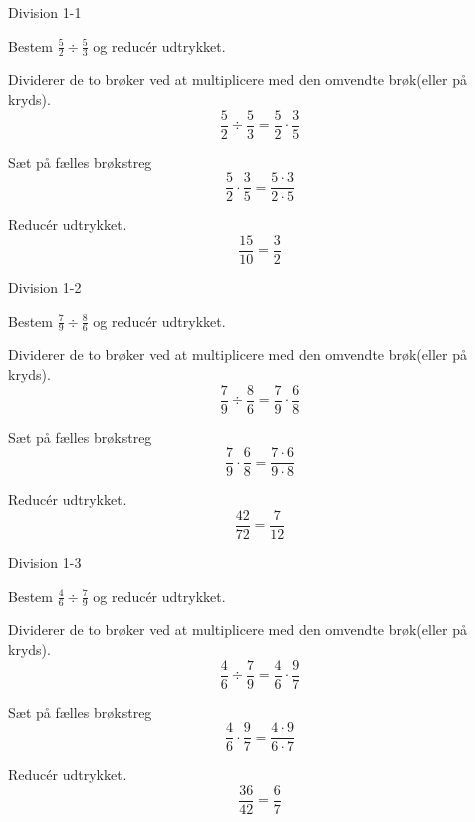\documentclass{article}
\begin{document}
\tableofcontents
\newpage

\begin{exercise}{Division 1-1}

Bestem $\frac{5}{2} \div \frac{5}{3}$ og reducér udtrykket.


\hint

Dividerer de to brøker ved at multiplicere med den omvendte brøk(eller på kryds).
\[
\frac{5}{2} \div \frac{5}{3} = \frac{5}{2} \cdot \frac{3}{5}
\]

\hint

Sæt på fælles brøkstreg
\[
 \frac{5}{2} \cdot \frac{3}{5} = \frac{5 \cdot 3}{2 \cdot 5}
\]

\hint

Reducér udtrykket.
\[
\frac{15}{10} = \frac{3}{2} 
\]

\end{exercise}

\newpage

\begin{exercise}{Division 1-2}
	
	Bestem $\frac{7}{9} \div \frac{8}{6}$ og reducér udtrykket.
	
	
	\hint
	
	Dividerer de to brøker ved at multiplicere med den omvendte brøk(eller på kryds).
	\[
	\frac{7}{9} \div \frac{8}{6} = \frac{7}{9} \cdot \frac{6}{8}
	\]
	
	\hint
	
	Sæt på fælles brøkstreg
	\[
	\frac{7}{9} \cdot \frac{6}{8} = \frac{7 \cdot 6}{9 \cdot 8}
	\]
	
	\hint
	
	Reducér udtrykket.
	\[
	\frac{42}{72} = \frac{7}{12} 
	\]
	
\end{exercise}

\newpage

\begin{exercise}{Division 1-3}
	
	Bestem $\frac{4}{6} \div \frac{7}{9}$ og reducér udtrykket.
	
	
	\hint
	
	Dividerer de to brøker ved at multiplicere med den omvendte brøk(eller på kryds).
	\[
	\frac{4}{6} \div \frac{7}{9} = \frac{4}{6} \cdot \frac{9}{7}
	\]
	
	\hint
	
	Sæt på fælles brøkstreg
	\[
	\frac{4}{6} \cdot \frac{9}{7} = \frac{4 \cdot 9}{6 \cdot 7}
	\]
	
	\hint
	
	Reducér udtrykket.
	\[
	\frac{36}{42} = \frac{6}{7} 
	\]
	
\end{exercise}
\end{document}
